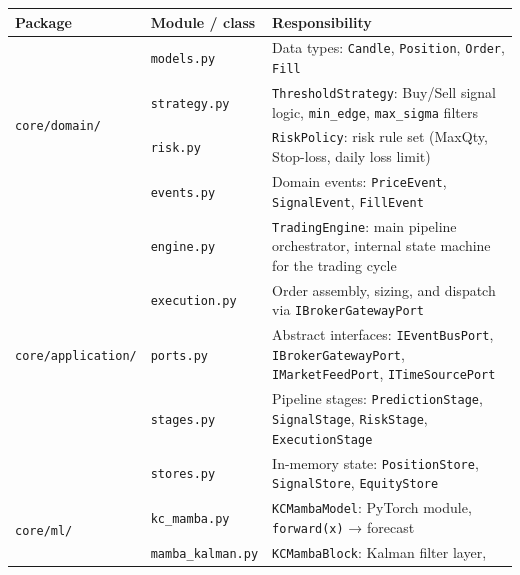 \begin{table}[H]
  \centering
  \footnotesize
  \renewcommand{\arraystretch}{1.25}
  \begin{tabular}{|l|p{4.2cm}|p{6.3cm}|}
    \hline
    \textbf{Package} & \textbf{Module / class} & \textbf{Responsibility} \\
    \hline\hline
    \multirow{4}{*}{\texttt{core/domain/}}
      & \texttt{models.py}      & Data types: \texttt{Candle}, \texttt{Position}, \texttt{Order}, \texttt{Fill} \\
      & \texttt{strategy.py}    & \texttt{ThresholdStrategy}: Buy/Sell signal logic,
                                  \texttt{min\_edge}, \texttt{max\_sigma} filters \\
      & \texttt{risk.py}        & \texttt{RiskPolicy}: risk rule set
                                  (MaxQty, Stop-loss, daily loss limit) \\
      & \texttt{events.py}      & Domain events: \texttt{PriceEvent},
                                  \texttt{SignalEvent}, \texttt{FillEvent} \\
    \hline
    \multirow{5}{*}{\texttt{core/application/}}
      & \texttt{engine.py}      & \texttt{TradingEngine}: main pipeline orchestrator,
                                  internal state machine for the trading cycle \\
      & \texttt{execution.py}   & Order assembly, sizing, and dispatch via
                                  \texttt{IBrokerGatewayPort} \\
      & \texttt{ports.py}       & Abstract interfaces:
                                  \texttt{IEventBusPort}, \texttt{IBrokerGatewayPort},
                                  \texttt{IMarketFeedPort}, \texttt{ITimeSourcePort} \\
      & \texttt{stages.py}      & Pipeline stages: \texttt{PredictionStage},
                                  \texttt{SignalStage}, \texttt{RiskStage},
                                  \texttt{ExecutionStage} \\
      & \texttt{stores.py}      & In-memory state: \texttt{PositionStore},
                                  \texttt{SignalStore}, \texttt{EquityStore} \\
    \hline
    \multirow{4}{*}{\texttt{core/ml/}}
      & \texttt{kc\_mamba.py}         & \texttt{KCMambaModel}: PyTorch module,
                                          \texttt{forward(x)} → forecast \\
      & \texttt{mamba\_kalman.py}      & \texttt{KCMambaBlock}: Kalman filter layer,

\end{tabular}
\end{table}
